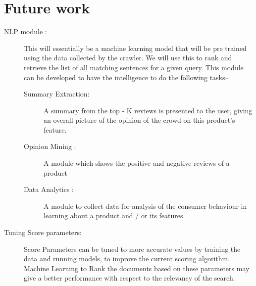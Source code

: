 \documentclass{article}
\begin{document}
\section{Future work}
\begin{description}
  \item[NLP module :] This will essentially be a machine learning model that will be pre trained using the data collected by the crawler. We will use this to rank and retrieve the list of all matching sentences for a given query. This module can be developed to have the intelligence to do the following tasks--
	\begin{description}
		\item[Summary Extraction: ] A summary from the top - K reviews is presented to the user, giving an overall picture of the opinion of the crowd on this product's feature. 
		\item[Opinion Mining :] A module which shows the positive and negative reviews of a product
		\item[Data Analytics :] A module to collect data for analysis of the consumer behaviour in learning about a product and / or its features.
	\end{description}
 \item[Tuning Score parameters: ] Score Parameters can be tuned to more accurate values by training the data and running models, to improve the current scoring algorithm. Machine Learning to Rank the documents based on these parameters  may give a better performance with respect to the relevancy of the search.

\end{description}
\end{document}
